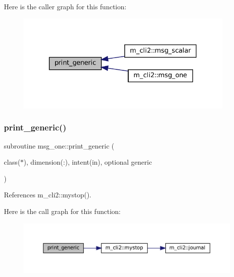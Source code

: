 Here is the caller graph for this function\+:\nopagebreak
\begin{figure}[H]
\begin{center}
\leavevmode
\includegraphics[width=306pt]{M__CLI2_8f90_aaa8ee15f943d8e1543ae35ab732c3cd2_icgraph}
\end{center}
\end{figure}
\mbox{\label{M__CLI2_8f90_a9d5e1620d474ac03a74eeb9b0f7d6ae1}} 
\subsubsection{\texorpdfstring{print\+\_\+generic()}{print\_generic()}\hspace{0.1cm}{\footnotesize\ttfamily [2/2]}}
{\footnotesize\ttfamily subroutine msg\+\_\+one\+::print\+\_\+generic (\begin{DoxyParamCaption}\item[{class($\ast$), dimension(\+:), intent(in), optional}]{generic }\end{DoxyParamCaption})\hspace{0.3cm}{\ttfamily [private]}}



References m\+\_\+cli2\+::mystop().

Here is the call graph for this function\+:
\nopagebreak
\begin{figure}[H]
\begin{center}
\leavevmode
\includegraphics[width=350pt]{M__CLI2_8f90_a9d5e1620d474ac03a74eeb9b0f7d6ae1_cgraph}
\end{center}
\end{figure}
